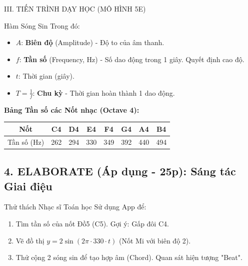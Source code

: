 \documentclass[12pt,a4paper]{article}
\begin{document}
\begin{sectionbox}{III. TIẾN TRÌNH DẠY HỌC (MÔ HÌNH 5E)}
\begin{mathbox}{Hàm Sóng Sin}
Trong đó:
\begin{itemize}
    \item $A$: \textbf{Biên độ} (Amplitude) - Độ to của âm thanh.
    \item $f$: \textbf{Tần số} (Frequency, Hz) - Số dao động trong 1 giây. Quyết định cao độ.
    \item $t$: Thời gian (giây).
    \item $T = \frac{1}{f}$: \textbf{Chu kỳ} - Thời gian hoàn thành 1 dao động.
\end{itemize}

\textbf{Bảng Tần số các Nốt nhạc (Octave 4):}
\begin{center}
\begin{tabular}{|c|c|c|c|c|c|c|c|}
\hline
Nốt & C4 & D4 & E4 & F4 & G4 & A4 & B4 \\
\hline
Tần số (Hz) & 262 & 294 & 330 & 349 & 392 & 440 & 494 \\
\hline
\end{tabular}
\end{center}
\end{mathbox}

\begin{center}
\end{center}

\subsection*{4. ELABORATE (Áp dụng - 25p): Sáng tác Giai điệu}
\begin{activitybox}{Thử thách Nhạc sĩ Toán học}
Sử dụng App để:
\begin{enumerate}
    \item Tìm tần số của nốt Đồ5 (C5). Gợi ý: Gấp đôi C4.
    \item Vẽ đồ thị $y = 2\sin(2\pi \cdot 330 \cdot t)$ (Nốt Mi với biên độ 2).
    \item Thử cộng 2 sóng sin để tạo hợp âm (Chord). Quan sát hiện tượng "Beat".
\end{enumerate}
\end{activitybox}


\end{sectionbox}
\end{document}
